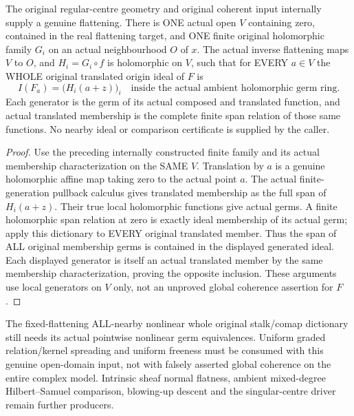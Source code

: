 \begin{theorem}
\label{hir:real-centre-domain-whole-nearby-translated-ideals}
\leanok
The original regular-centre geometry and original coherent input
internally supply a genuine flattening. There is ONE
actual open $V$ containing zero, contained in the real flattening target,
and ONE finite original holomorphic family $G_i$ on an actual
neighbourhood $O$ of $x$. The actual inverse flattening maps $V$ to $O$,
and $H_i=G_i\circ f$ is holomorphic on $V$, such that for
EVERY $a\in V$ the WHOLE original translated origin ideal of $F$ is
\[
 I(F_a)=\bigl(H_i(a+z)\bigr)_i
 \quad\text{inside the actual ambient holomorphic germ ring.}
\]
Each generator is the germ of its actual composed and translated
function, and actual translated membership is the complete finite
span relation of those same functions. No nearby ideal or comparison
certificate is supplied by the caller.
\end{theorem}
\begin{proof}
Use the preceding internally constructed finite family and its actual
membership characterization on the SAME $V$. Translation by $a$ is a
genuine holomorphic affine map taking zero to the actual point $a$.
The actual finite-generation pullback calculus gives translated
membership as the full span of $H_i(a+z)$. Their true local holomorphic
functions give actual germs. A finite holomorphic span relation at zero
is exactly ideal membership of its actual germ; apply this dictionary
to EVERY original translated member. Thus the span of ALL original
membership germs is contained in the displayed generated ideal.
Each displayed generator is itself an actual translated member by the
same membership characterization, proving the opposite inclusion.
These arguments use local generators on $V$ only, not an unproved
global coherence assertion for $F$.
\end{proof}

The fixed-flattening ALL-nearby nonlinear whole original stalk/comap
dictionary still needs its actual pointwise nonlinear germ equivalences.
Uniform graded relation/kernel spreading and uniform freeness must be
consumed with this genuine open-domain input, not with falsely asserted
global coherence on the entire complex model. Intrinsic sheaf normal
flatness, ambient mixed-degree Hilbert--Samuel comparison, blowing-up
descent and the singular-centre driver remain further producers.
